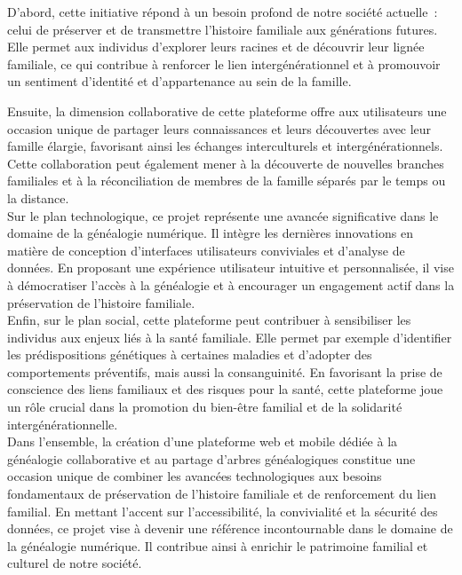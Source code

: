 D'abord, cette initiative répond à un besoin profond de notre société actuelle :
celui de préserver et de transmettre l’histoire familiale aux générations futures.
Elle permet aux individus d’explorer leurs racines et de découvrir leur lignée
familiale, ce qui contribue à renforcer le lien intergénérationnel et à promouvoir
un sentiment d’identité et d’appartenance au sein de la famille.

Ensuite, la dimension collaborative de cette plateforme offre aux utilisateurs une
occasion unique de partager leurs connaissances et leurs découvertes avec leur famille
élargie, favorisant ainsi les échanges interculturels et intergénérationnels.
Cette collaboration peut également mener à la découverte de nouvelles branches
familiales et à la réconciliation de membres de la famille séparés par le temps ou la distance. \\


Sur le plan technologique, ce projet représente une avancée significative dans le
domaine de la généalogie numérique. Il intègre les dernières innovations en
matière de conception d’interfaces utilisateurs conviviales et d’analyse de données.
En proposant une expérience utilisateur intuitive et personnalisée, il vise à
démocratiser l’accès à la généalogie et à encourager un engagement actif dans
la préservation de l’histoire familiale. \\


Enfin, sur le plan social, cette plateforme peut contribuer à sensibiliser les
individus aux enjeux liés à la santé familiale. Elle permet par exemple d’identifier
les prédispositions génétiques à certaines maladies et d’adopter des comportements
préventifs, mais aussi la consanguinité. En favorisant la prise de conscience des
liens familiaux et des risques pour la santé, cette plateforme joue un rôle crucial
dans la promotion du bien-être familial et de la solidarité intergénérationnelle. \\

Dans l’ensemble, la création d’une plateforme web et mobile dédiée à la généalogie
collaborative et au partage d’arbres généalogiques constitue une occasion unique
de combiner les avancées technologiques aux besoins fondamentaux de préservation
de l’histoire familiale et de renforcement du lien familial. En mettant l’accent
sur l’accessibilité, la convivialité et la sécurité des données, ce projet vise à
devenir une référence incontournable dans le domaine de la généalogie numérique.
Il contribue ainsi à enrichir le patrimoine familial et culturel de notre société. \\


